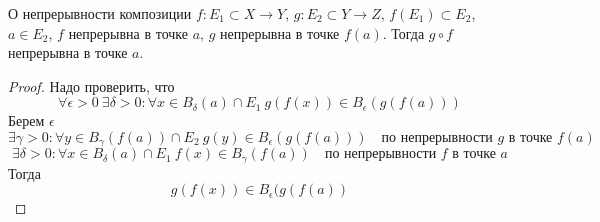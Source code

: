 \begin{theorem}{О непрерывности композиции}
$f\colon E_1 \subset X \to Y$, $g\colon E_2 \subset Y \to Z$, $f(E_1) \subset E_2$, $a \in E_2$, $f$ непрерывна в точке $a$, $g$ непрерывна в точке $f(a)$. Тогда $g \circ f$ непрерывна в точке $a$.
\end{theorem}
\begin{proof}
Надо проверить, что 
$$\forall \epsilon > 0\: \exists \delta > 0\colon \forall x \in B_{\delta}(a) \cap E_1\: g(f(x)) \in B_{\epsilon}(g(f(a)))$$
Берем $\epsilon$
$$\exists \gamma > 0\colon \forall y \in B_{\gamma}(f(a)) \cap E_2\: g(y) \in B_{\epsilon}(g(f(a))) \quad \text{по непрерывности $g$ в точке $f(a)$}$$
$$\exists \delta > 0\colon \forall x \in B_{\delta}(a) \cap E_1\: f(x) \in B_{\gamma}(f(a)) \quad \text{по непрерывности $f$ в точке $a$}$$
Тогда
$$g(f(x)) \in B_{\epsilon}(g(f(a))$$
\end{proof}
